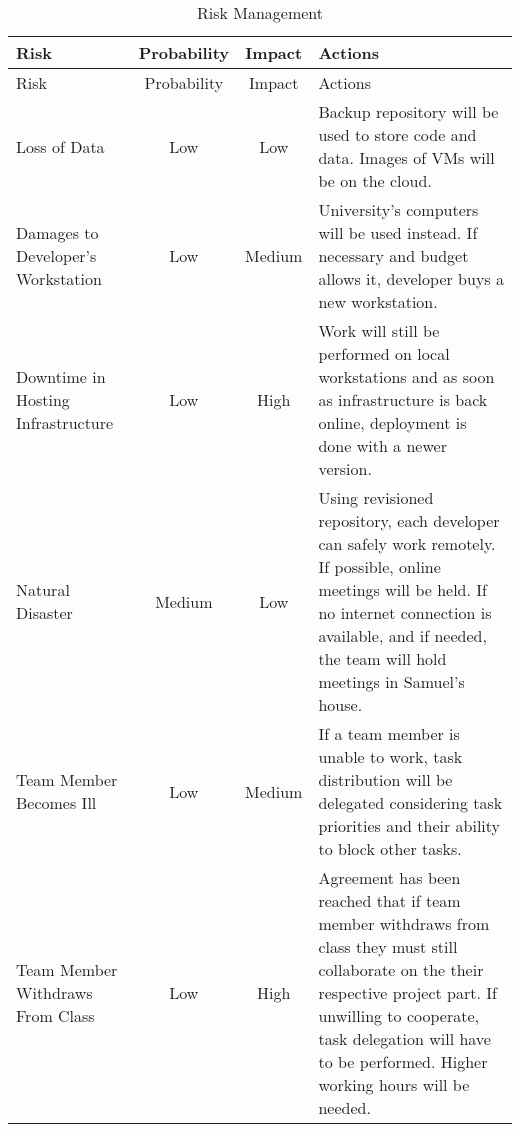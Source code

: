\begin{center}
\setlength{\extrarowheight}{1.5pt}
    \begin{longtable}{|m{5cm}|c|c|m{5cm}|}
 \caption{Risk Management} \\
     \hline
    
    \centering  Risk & Probability & Impact & Actions \\
    \hline \hline \endfirsthead
    
         \hline

	\centering  Risk & Probability & Impact & Actions \\    
	\hline \hline \endhead
    
    \endfoot  
Loss of Data    & Low           & Low      & Backup repository will be used to store code and data. Images of VMs will be on the cloud.       \\ \hline
Damages to Developer's Workstation  & Low           & Medium      & University's computers will be used instead. If necessary and budget allows it, developer buys a new workstation.       \\  \hline
    Downtime in Hosting Infrastructure & Low           & High      & Work will still be performed on local workstations and as soon as infrastructure is back online, deployment is done with a newer version.       \\  \hline
    Natural Disaster    & Medium           & Low      & Using revisioned repository, each developer can safely work remotely. If possible, online meetings will be held. If no internet connection is available, and if needed, the team will hold meetings in Samuel's house.       \\  \hline
    Team Member Becomes Ill    & Low           & Medium      & If a team member is unable to work, task distribution will be delegated considering task priorities and their ability to block other tasks.       \\  \hline
    Team Member Withdraws From Class   & Low           & High      & Agreement has been reached that if team member withdraws from class they must still collaborate on the their respective project part. If unwilling to cooperate, task delegation will have to be performed. Higher working hours will be needed.       \\  \hline
\end{longtable}
\end{center}
